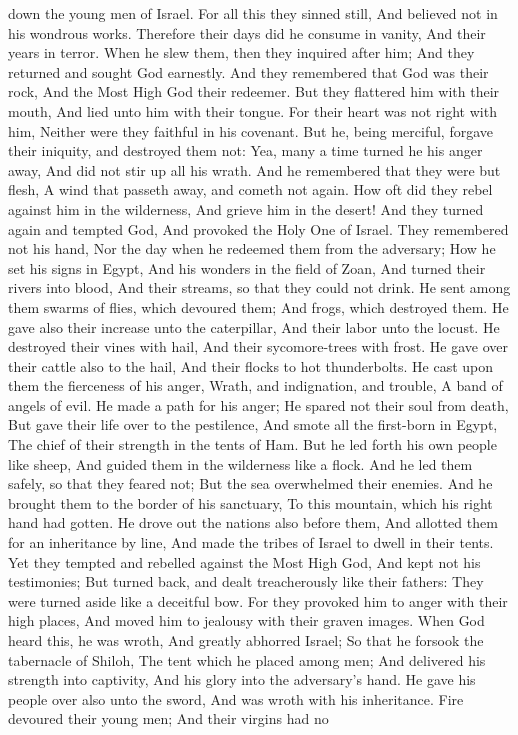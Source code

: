 down the young men of Israel.  For all this they sinned still, And believed not in his wondrous works.  Therefore their days did he consume in vanity, And their years in terror.  When he slew them, then they inquired after him; And they returned and sought God earnestly.  And they remembered that God was their rock, And the Most High God their redeemer.  But they flattered him with their mouth, And lied unto him with their tongue.  For their heart was not right with him, Neither were they faithful in his covenant.  But he, being merciful, forgave their iniquity, and destroyed them not: Yea, many a time turned he his anger away, And did not stir up all his wrath.  And he remembered that they were but flesh, A wind that passeth away, and cometh not again.  How oft did they rebel against him in the wilderness, And grieve him in the desert!  And they turned again and tempted God, And provoked the Holy One of Israel.  They remembered not his hand, Nor the day when he redeemed them from the adversary;  How he set his signs in Egypt, And his wonders in the field of Zoan,  And turned their rivers into blood, And their streams, so that they could not drink.  He sent among them swarms of flies, which devoured them; And frogs, which destroyed them.  He gave also their increase unto the caterpillar, And their labor unto the locust.  He destroyed their vines with hail, And their sycomore-trees with frost.  He gave over their cattle also to the hail, And their flocks to hot thunderbolts.  He cast upon them the fierceness of his anger, Wrath, and indignation, and trouble, A band of angels of evil.  He made a path for his anger; He spared not their soul from death, But gave their life over to the pestilence,  And smote all the first-born in Egypt, The chief of their strength in the tents of Ham.  But he led forth his own people like sheep, And guided them in the wilderness like a flock.  And he led them safely, so that they feared not; But the sea overwhelmed their enemies.  And he brought them to the border of his sanctuary, To this mountain, which his right hand had gotten.  He drove out the nations also before them, And allotted them for an inheritance by line, And made the tribes of Israel to dwell in their tents.  Yet they tempted and rebelled against the Most High God, And kept not his testimonies;  But turned back, and dealt treacherously like their fathers: They were turned aside like a deceitful bow.  For they provoked him to anger with their high places, And moved him to jealousy with their graven images.  When God heard this, he was wroth, And greatly abhorred Israel;  So that he forsook the tabernacle of Shiloh, The tent which he placed among men;  And delivered his strength into captivity, And his glory into the adversary’s hand.  He gave his people over also unto the sword, And was wroth with his inheritance.  Fire devoured their young men; And their virgins had no 